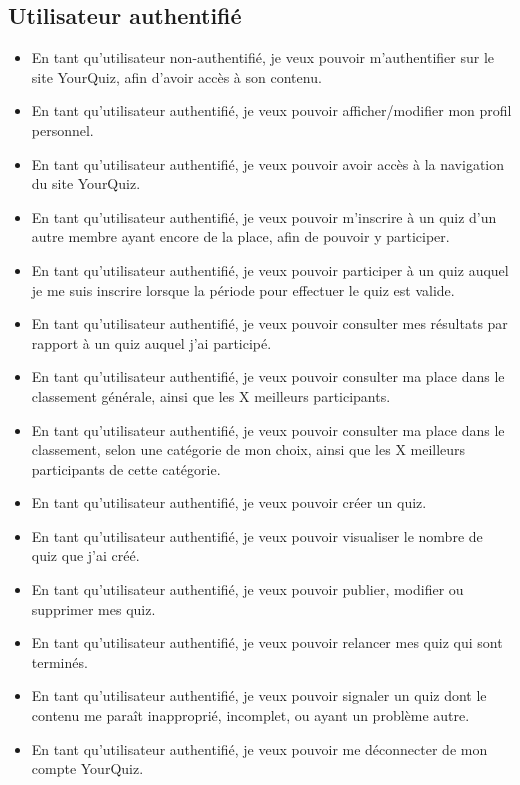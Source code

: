 \documentclass[a4paper, 12pt]{article}
\begin{document}
\subsection{Utilisateur authentifié}
\begin{itemize}
    \item En tant qu’utilisateur non-authentifié, je veux pouvoir m’authentifier sur le site YourQuiz, afin d’avoir accès à son contenu.
    \item En tant qu’utilisateur authentifié, je veux pouvoir afficher/modifier mon profil personnel.
    \item En tant qu’utilisateur authentifié, je veux pouvoir avoir accès à la navigation du site YourQuiz.
    \item En tant qu’utilisateur authentifié, je veux pouvoir m’inscrire à un quiz d’un autre membre ayant encore de la place, afin de pouvoir y participer.
    \item En tant qu’utilisateur authentifié, je veux pouvoir participer à un quiz auquel je me suis inscrire lorsque la période pour effectuer le quiz est valide.
    \item En tant qu’utilisateur authentifié, je veux pouvoir consulter mes résultats par rapport à un quiz auquel j’ai participé.
    \item En tant qu’utilisateur authentifié, je veux pouvoir consulter ma place dans le classement générale, ainsi que les X meilleurs participants.
    \item En tant qu’utilisateur authentifié, je veux pouvoir consulter ma place dans le classement, selon une catégorie de mon choix, ainsi que les X meilleurs participants de cette catégorie.
    \item En tant qu’utilisateur authentifié, je veux pouvoir créer un quiz.
    \item En tant qu’utilisateur authentifié, je veux pouvoir visualiser le nombre de quiz que j’ai créé.
    \item En tant qu’utilisateur authentifié, je veux pouvoir publier, modifier ou supprimer mes quiz.
    \item En tant qu’utilisateur authentifié, je veux pouvoir relancer mes quiz qui sont terminés.
    \item En tant qu’utilisateur authentifié, je veux pouvoir signaler un quiz dont le contenu me paraît inapproprié, incomplet, ou ayant un problème autre.
    \item En tant qu’utilisateur authentifié, je veux pouvoir me déconnecter de mon compte YourQuiz.
\end{itemize}
\end{document}
